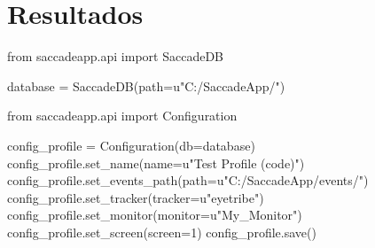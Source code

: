 \documentclass[\main/main.tex]{subfiles}
\begin{document}
\chapter{Resultados}
\label{cha:04_resultados} 



\begin{singlespace}\begin{python}
from saccadeapp.api import SaccadeDB

database = SaccadeDB(path=u"C:/SaccadeApp/")
\end{python}\end{singlespace}
        
\begin{singlespace}\begin{python}
from saccadeapp.api import Configuration

config_profile = Configuration(db=database)
config_profile.set_name(name=u"Test Profile (code)")
config_profile.set_events_path(path=u"C:/SaccadeApp/events/")
config_profile.set_tracker(tracker=u"eyetribe")
config_profile.set_monitor(monitor=u"My_Monitor")
config_profile.set_screen(screen=1)
config_profile.save()
\end{python}\end{singlespace}
\end{document}
